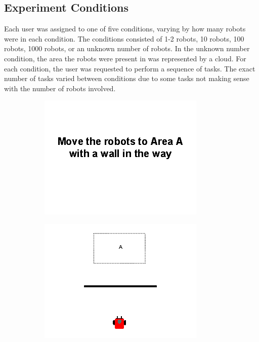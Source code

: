 \subsection{Experiment Conditions} \label{section:Experiment_Conditions}

Each user was assigned to one of five conditions, varying by how many robots were in each condition. 
The conditions consisted of 1-2 robots, 10 robots, 100 robots, 1000 robots, or an unknown number of robots.
In the unknown number condition, the area the robots were present in was represented by a cloud. 
For each condition, the user was requested to perform a sequence of tasks. 
The exact number of tasks varied between conditions due to some tasks not making sense with the number of robots involved. 

\begin{figure}
	\centering
	\begin{subfigure}{0.4\textwidth}
		\includegraphics[width=\linewidth]{../ui_experiment/slide_images/Swarm_Robot_Control_-_10_Robot_0004.png}
	\end{subfigure}
	\begin{subfigure}{0.4\textwidth}
		\includegraphics[width=\linewidth]{../ui_experiment/slide_images/Swarm_Robot_Control_-_Single_Robot_0005.png}

\end{subfigure}
\end{figure}
